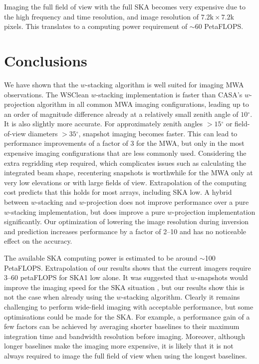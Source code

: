 \documentclass[useAMS,usenatbib]{mn2e}
\newcommand{\degree}{\ensuremath{^{\circ}}\xspace}
\begin{document}
Imaging the full field of view with the full SKA becomes very expensive due to the high frequency and time resolution, and image resolution of $7.2\textrm{k} \times 7.2$k pixels. This translates to a computing power requirement of $\sim60$ PetaFLOPS.

\section{Conclusions} \label{sec:conclusions}
We have shown that the $w$-stacking algorithm is well suited for imaging MWA observations. The WSClean $w$-stacking implementation is faster than CASA's $w$-projection algorithm in all common MWA imaging configurations, leading up to an order of magnitude difference already at a relatively small zenith angle of $10$\degree. It is also slightly more accurate. For approximately zenith angles $>15\degree$ or field-of-view diameters $>35\degree$, snapshot imaging becomes faster. This can lead to performance improvements of a factor of $3$ for the MWA, but only in the most expensive imaging configurations that are less commonly used. Considering the extra regridding step required, which complicates issues such as calculating the integrated beam shape, recentering snapshots is worthwhile for the MWA only at very low elevations or with large fields of view. Extrapolation of the computing cost predicts that this holds for most arrays, including SKA low. A hybrid between $w$-stacking and $w$-projection does not improve performance over a pure $w$-stacking implementation, but does improve a pure $w$-projection implementation significantly. Our optimization of lowering the image resolution during inversion and prediction increases performance by a factor of 2--10 and has no noticeable effect on the accuracy.

The available SKA computing power is estimated to be around $\sim$100 PetaFLOPS. Extrapolation of our results shows that the current imagers require $3$--$60$ petaFLOPS for SKA1 low alone. It was suggested that $w$-snapshots would improve the imaging speed for the SKA situation \citep{widefield-imaging-ska-cornwell}, but our results show this is not the case when already using the $w$-stacking algorithm. Clearly it remains challenging to perform wide-field imaging with acceptable performance, but some optimisations could be made for the SKA. For example, a performance gain of a few factors can be achieved by averaging shorter baselines to their maximum integration time and bandwidth resolution before imaging. Moreover, although longer baselines make the imaging more expensive, it is likely that it is not always required to image the full field of view when using the longest baselines.
\end{document}
